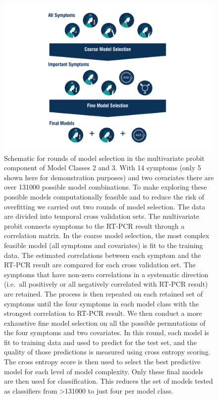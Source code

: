 \documentclass[]{elsarticle} %
\begin{document}
\begin{figure}
\hypertarget{fig:modsel-flowchart}{%
\centering
\includegraphics[width=4.375in,height=3.10417in]{MainTextFigs/ModelSelectionFlowchart.pdf}
\caption{Schematic for rounds of model selection in the multivariate
probit component of Model Classes 2 and 3. With 14 symptoms (only 5
shown here for demonstration purposes) and two covariates there are over
131000 possible model combinations. To make exploring these possible
models computationally feasible and to reduce the risk of overfitting we
carried out two rounds of model selection. The data are divided into
temporal cross validation sets. The multivariate probit connects
symptoms to the RT-PCR result through a correlation matrix. In the
coarse model selection, the most complex feasible model (all symptoms
and covariates) is fit to the training data. The estimated correlations
between each symptom and the RT-PCR result are compared for each cross
validation set. The symptoms that have non-zero correlations in a
systematic direction (i.e.~all positively or all negatively correlated
with RT-PCR result) are retained. The process is then repeated on each
retained set of symptoms until the four symptoms in each model class
with the strongest correlation to RT-PCR result. We then conduct a more
exhaustive fine model selection on all the possible permutations of the
four symptoms and two covariates. In this round, each model is fit to
training data and used to predict for the test set, and the quality of
those predictions is measured using cross entropy scoring. The cross
entropy score is then used to select the best predictive model for each
level of model complexity. Only these final models are then used for
classification. This reduces the set of models tested as classifiers
from \textgreater131000 to just four per model class.\\
}\label{fig:modsel-flowchart}
}
\end{figure}
\end{document}
